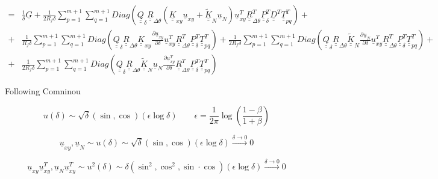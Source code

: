 \documentclass[a4paper]{jpconf}
\begin{document}
\begin{equation}
\begin{split}
=&\frac{1}{\delta}\underline{G}+\frac{1}{2R_{f}\delta}\sum_{p=1}^{m+1}\sum_{q=1}^{m+1}Diag\left(\underline{\underline{Q}}_{\delta}\underline{\underline{R}}_{\Delta\theta}\left(\underline{\underline{K}}_{xy}\underline{u}_{xy}+\underline{\underline{\widetilde{K}}}_{N}\underline{u}_{N}\right)\underline{u}_{xy}^{T}\underline{\underline{R}}_{\Delta\theta}^{T}\underline{\underline{P}}_{\delta}^{T}\underline{\underline{D}}^{T}\underline{\underline{T}}_{pq}^{T}\right)+\\
+&\frac{1}{R_{f}\delta}\sum_{p=1}^{m+1}\sum_{q=1}^{m+1}Diag\left(\underline{\underline{Q}}_{\delta}\underline{\underline{R}}_{\Delta\theta}\underline{\underline{K}}_{xy}\frac{\partial \underline{u}_{xy}}{\partial \delta}\underline{u}_{xy}^{T}\underline{\underline{R}}_{\Delta\theta}^{T}\underline{\underline{P}}_{\delta}^{T}\underline{\underline{T}}_{pq}^{T}\right)+\frac{1}{2R_{f}\delta}\sum_{p=1}^{m+1}\sum_{q=1}^{m+1}Diag\left(\underline{\underline{Q}}_{\delta}\underline{\underline{R}}_{\Delta\theta}\underline{\underline{\widetilde{K}}}_{N}\frac{\partial \underline{u}_{N}}{\partial \delta}\underline{u}_{xy}^{T}\underline{\underline{R}}_{\Delta\theta}^{T}\underline{\underline{P}}_{\delta}^{T}\underline{\underline{T}}_{pq}^{T}\right)+\\
+&\frac{1}{2R_{f}\delta}\sum_{p=1}^{m+1}\sum_{q=1}^{m+1}Diag\left(\underline{\underline{Q}}_{\delta}\underline{\underline{R}}_{\Delta\theta}\underline{\underline{\widetilde{K}}}_{N}\underline{u}_{N}\frac{\partial \underline{u}_{xy}^{T}}{\partial \delta}\underline{\underline{R}}_{\Delta\theta}^{T}\underline{\underline{P}}_{\delta}^{T}\underline{\underline{T}}_{pq}^{T}\right)
\end{split}
\end{equation}

Following Comninou

\begin{equation}
u\left(\delta\right)\sim \sqrt{\delta}\left(\sin,\cos\right)\left(\epsilon\log{\delta}\right)\qquad\epsilon=\frac{1}{2\pi}\log{\left(\frac{1-\beta}{1+\beta}\right)}
\end{equation}

\begin{equation}
\underline{u}_{xy},\underline{u}_{N}\sim u\left(\delta\right)\sim\sqrt{\delta}\left(\sin,\cos\right)\left(\epsilon\log{\delta}\right)\xrightarrow{\delta\rightarrow 0}0
\end{equation}

\begin{equation}
\underline{u}_{xy}\underline{u}_{xy}^{T},\underline{u}_{N}\underline{u}_{xy}^{T}\sim u^{2}\left(\delta\right)\sim\delta\left(\sin^{2},\cos^{2},\sin\cdot\cos\right)\left(\epsilon\log{\delta}\right)\xrightarrow{\delta\rightarrow 0}0
\end{equation}
\end{document}
